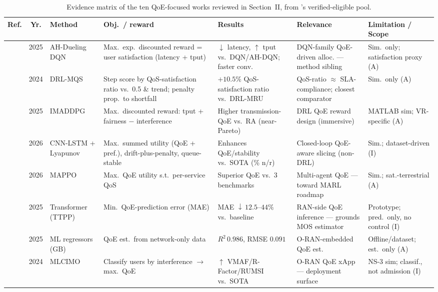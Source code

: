 \documentclass[conference]{IEEEtran}
\renewcommand{\arraystretch}{0.92}
\begin{document}
\begin{table}[t]
\centering
\scriptsize
\setlength{\tabcolsep}{2pt}\renewcommand{\arraystretch}{1.05}
\caption{Evidence matrix of the ten QoE-focused works reviewed in Section~II, from \cite{survey-paper3}'s verified-eligible pool.}
\label{tab:qoe_evidence_matrix}
\begin{tabular}{c c C{2.3cm} C{4.4cm} C{2.9cm} C{3.0cm} C{2.2cm}}
\toprule
\textbf{Ref.} & \textbf{Yr.} & \textbf{Method} & \textbf{Obj.\ / reward} & \textbf{Results} & \textbf{Relevance} & \textbf{Limitation / Scope} \\
\midrule
\cite{wang2025usercentric} & 2025 & AH-Dueling DQN & Max.\ exp.\ discounted reward = user satisfaction (latency + tput) & $\downarrow$ latency, $\uparrow$ tput vs.\ DQN/AH-DQN; faster conv. & DQN-family QoE-driven alloc. --- method sibling & Sim.\ only; satisfaction proxy (A) \\
\cite{lai2024multiresource} & 2024 & DRL-MQS & Step score by QoS-satisfaction ratio vs.\ 0.5 \& trend; penalty prop.\ to shortfall & $+10.5\%$ QoS-satisfaction ratio vs.\ DRL-MRU & QoS-ratio $\approx$ SLA-compliance; closest comparator & Sim.\ only (A) \\
\cite{kougioumtzidis2025drlvr} & 2025 & IMADDPG & Max.\ discounted reward: tput + fairness $-$ interference & Higher transmission-QoE vs.\ RA (near-Pareto) & DRL QoE reward design (immersive) & MATLAB sim; VR-specific (A) \\
\cite{chen2026qoeslicing} & 2026 & CNN-LSTM + Lyapunov & Max.\ summed utility (QoE + pref.), drift-plus-penalty, queue-stable & Enhances QoE/stability vs.\ SOTA (\% n/r) & Closed-loop QoE-aware slicing (non-DRL) & Sim.; dataset-driven (I) \\
\cite{yin2026qoestin} & 2026 & MAPPO & Max.\ QoE utility s.t.\ per-service QoS & Superior QoE vs.\ 3 benchmarks & Multi-agent QoE --- toward MARL roadmap & Sim.; sat.-terrestrial (A) \\
\cite{sun2025qoeric} & 2025 & Transformer (TTPP) & Min.\ QoE-prediction error (MAE) & MAE $\downarrow\,12.5$--$44\%$ vs.\ baseline & RAN-side QoE inference --- grounds MOS estimator & Prototype; pred.\ only, no control (I) \\
\cite{gonzalez2025qoeoran} & 2025 & ML regressors (GB) & QoE est.\ from network-only data & $R^2\,0.986$, RMSE $0.091$ & O-RAN-embedded QoE est. & Offline/dataset; est.\ only (A) \\
\cite{anand2024qoexapp} & 2024 & MLCIMO & Classify users by interference $\to$ max.\ QoE & $\uparrow$ VMAF/R-Factor/RUMSI vs.\ SOTA & O-RAN QoE xApp --- deployment surface & NS-3 sim; classif., not admission (I) \\

\end{tabular}
\end{table}
\end{document}
